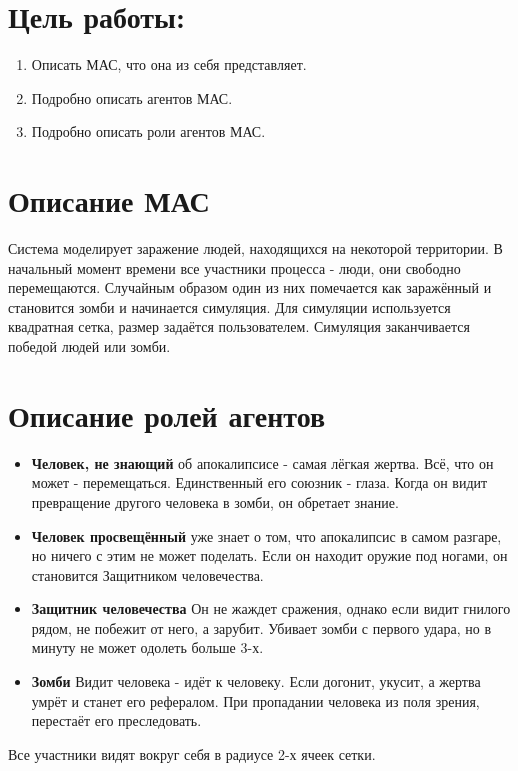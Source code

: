 \section{Цель работы:}
	\begin{enumerate}
		\item Описать МАС, что она из себя представляет.
		\item Подробно описать агентов МАС.
		\item Подробно описать роли агентов МАС.
	\end{enumerate}

\section{Описание МАС}
	Система моделирует заражение людей, находящихся на некоторой территории. В начальный момент времени все участники процесса - люди, они свободно перемещаются. Случайным образом один из них помечается как заражённый и становится зомби и начинается симуляция. Для симуляции используется квадратная сетка, размер задаётся пользователем. Симуляция заканчивается победой людей или зомби.
	 

\section{Описание ролей агентов}

	\begin{itemize}
		\item{\textbf{Человек, не знающий}} об апокалипсисе - самая лёгкая жертва. Всё, что он может - перемещаться. Единственный его союзник - глаза. Когда он видит превращение другого человека в зомби, он обретает знание.
		\item{\textbf{Человек просвещённый}} уже знает о том, что апокалипсис в самом разгаре, но ничего с этим не может поделать. Если он находит оружие под ногами, он становится Защитником человечества.
		\item{\textbf{Защитник человечества}} Он не жаждет сражения, однако если видит гнилого рядом, не побежит от него, а зарубит. Убивает зомби с первого удара, но в минуту не может одолеть больше 3-х.
		\item{\textbf{Зомби}} Видит человека - идёт к человеку. Если догонит, укусит, а жертва умрёт и станет его рефералом. При пропадании человека из поля зрения, перестаёт его преследовать.
	\end{itemize}
	Все участники видят вокруг себя в радиусе 2-х ячеек сетки.